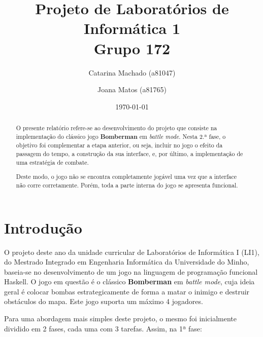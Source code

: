 \documentclass[a4paper]{article}
\title{Projeto de Laboratórios de Informática 1\\Grupo 172}
\author{Catarina Machado (a81047) \and Joana Matos (a81765)}
\date{\today}
\begin{document}
\maketitle

\begin{abstract}

O presente relatório refere-se ao desenvolvimento do projeto 
que consiste na implementação do clássico jogo \textbf{Bomberman} em 
\emph{battle mode}. Nesta 2.ª fase, o objetivo foi complementar 
a etapa anterior, ou seja, incluir no jogo o efeito da passagem 
do tempo, a construção da sua interface, e, por último, a implementação 
de uma estratégia de combate.

Deste modo, o jogo não se encontra completamente jogável uma vez 
que a interface não corre corretamente. Porém, toda a parte interna do 
jogo se apresenta funcional. 

\end{abstract}

\tableofcontents

\section{Introdução}
\label{sec:intro}
O projeto deste ano da unidade curricular de Laboratórios de Informática I (LI1), 
do Mestrado Integrado em Engenharia Informática da Universidade do Minho, baseia-se
no desenvolvimento de um jogo na linguagem de programação funcional Haskell. O jogo
em questão é o clássico \textbf{Bomberman} em \emph{battle mode}, cuja ideia geral 
é colocar bombas estrategicamente de forma a matar o inimigo e destruir obstáculos do mapa.
Este jogo suporta um máximo 4 jogadores.

Para uma abordagem mais simples deste projeto, o mesmo foi inicialmente dividido em 
2 fases, cada uma com 3 tarefas. Assim, na 1ª fase:
\end{document}
